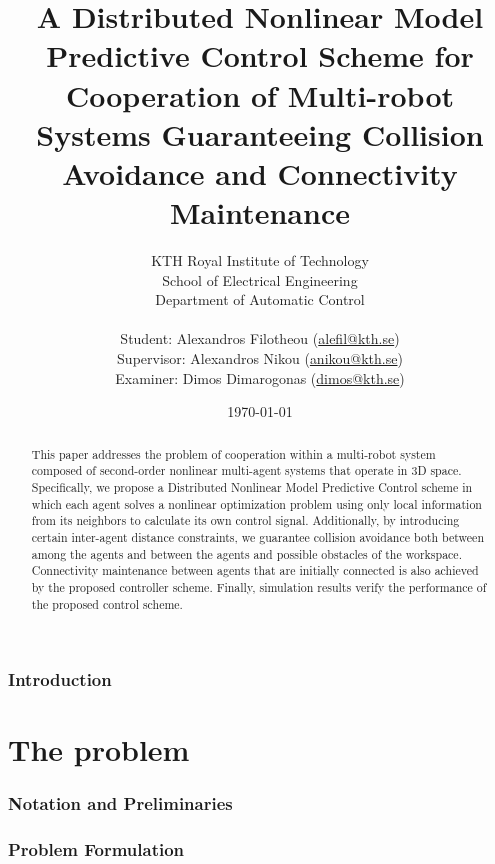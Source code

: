 \documentclass[a4paper,12pt,oneside]{article}
\title{\textbf{A Distributed Nonlinear Model Predictive Control Scheme for
Cooperation of Multi-robot Systems Guaranteeing Collision Avoidance and
Connectivity Maintenance}}
\author{KTH Royal Institute of Technology \\
  School of Electrical Engineering \\
  Department of Automatic Control \\ \\
Student: Alexandros Filotheou (\href{mailto: alefil@kth.se}{alefil@kth.se}) \\
Supervisor: Alexandros Nikou (\href{mailto: anikou@kth.se}{anikou@kth.se}) \\
Examiner: Dimos Dimarogonas (\href{mailto: dimos@kth.se}{dimos@kth.se}) \\}
\date{\today}
\begin{document}
\maketitle

\begin{abstract}
	This paper addresses the problem of cooperation within a multi-robot
  system composed of second-order nonlinear multi-agent systems that operate
  in $3$D space. Specifically, we propose a Distributed Nonlinear Model
  Predictive Control scheme in which each agent solves a nonlinear optimization
  problem using only local information from its neighbors to calculate its own
  control signal. Additionally, by introducing certain
  inter-agent distance constraints, we guarantee collision avoidance both
  between among the agents and between the agents and possible obstacles of the
  workspace. Connectivity maintenance between agents that are initially
  connected is also achieved by the proposed controller scheme. Finally,
  simulation results verify the  performance of the proposed control scheme.
\end{abstract}

\newevenside
\tableofcontents
\newevenside


\section{Introduction}

  
  \newevenside

\part{The problem}
\newevenside

  \section{Notation and Preliminaries}
    \label{sec:notation_reliminaries}

    
    
    
    \newevenside


  \section{Problem Formulation}
    \label{sec:prob_formulation}
\end{document}
